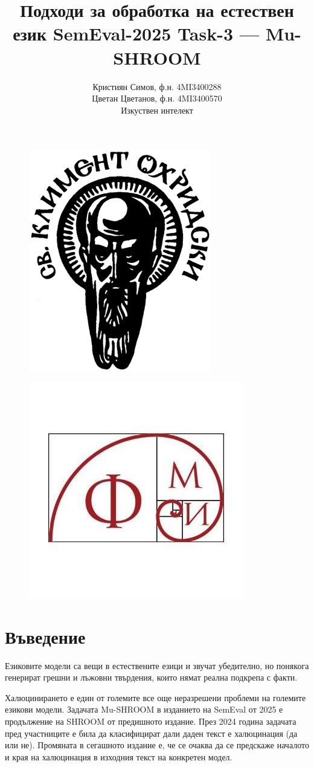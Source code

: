 \documentclass[12pt]{article}
\begin{document}
	
	\title{ Подходи за обработка на естествен език \newline SemEval-2025 Task-3 — Mu-SHROOM  \newline \hline}
	
	
	\author{Кристиян Симов, ф.н. 4MI3400288 \\ Цветан Цветанов, ф.н. 4MI3400570 \\ Изкуствен интелект}
	\maketitle
	
		\begin{figure}[H]
			\centering
			\includegraphics[width=0.25\linewidth]{clement-ohrid-logo.png}
		\end{figure}
		
		\begin{figure}[H]
			\centering
			\includegraphics[width=0.25\linewidth]{fmi-logo.jpg}
		\end{figure}
	
	
	\vspace{0.5in}
	\pagebreak
	
	\section{Въведение}

	Езиковите модели са вещи в естествените езици и звучат убедително, но понякога генерират грешни и лъжовни твърдения, които нямат реална подкрепа с факти. 

	Халюцинирането е един от големите все още неразрешени проблеми  на големите езикови модели.  Задачата  Mu-SHROOM в изданието на SemEval от 2025 е продължение на SHROOM от предишното издание. През 2024 година задачата пред участниците е била да класифицират дали даден текст е халюцинация (да или не). Промяната в сегашното издание е, че се очаква да се предскаже началото и края на халюцинация в изходния текст на конкретен модел.
	
\end{document}
